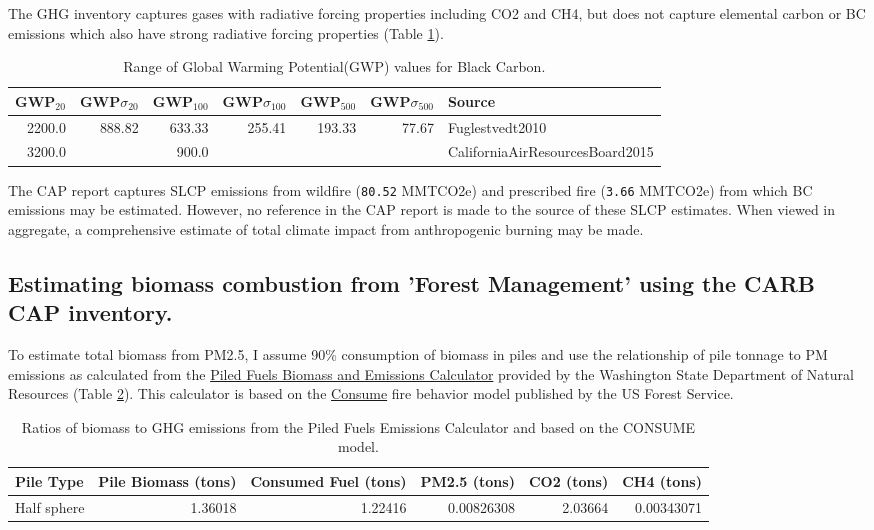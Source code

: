 \documentclass[a4paper,titlepage]{article}
\begin{document}
The \ac{GHG} inventory captures
gases with radiative forcing properties including CO2 and CH4, but does not capture elemental
carbon or \ac{BC} emissions which also have strong radiative
forcing properties (Table \ref{tab:bc_gwp}). 

\begin{table}[htb]
\centering
\begin{tabular}{rrrrrrl}
GWP\(_{\text{20}}\) & GWP\(\sigma_{\text{20}}\) & GWP\(_{\text{100}}\) & GWP\(\sigma_{\text{100}}\) & GWP\(_{\text{500}}\) & GWP\(\sigma_{\text{500}}\) & Source\\
\hline
2200.0 & 888.82 & 633.33 & 255.41 & 193.33 & 77.67 & Fuglestvedt2010\\
3200.0 &  & 900.0 &  &  &  & CaliforniaAirResourcesBoard2015\\
\end{tabular}
\caption{Range of Global Warming Potential(GWP) values for Black Carbon.\label{tab:bc_gwp}}

\end{table}


The \citet{CaliforniaAirResourcesBoard2015,CaliforniaAirResourcesBoard2016}
\ac{CAP} report captures \ac{SLCP} emissions from wildfire
(\texttt{80.52} MMTCO2e) and prescribed fire
(\texttt{3.66} MMTCO2e) from which \ac{BC} emissions may be estimated. However, no reference in the \ac{CAP} report is made to the source of these
SLCP estimates. When viewed in aggregate, a comprehensive estimate of total climate impact from anthropogenic burning may be made. 

\subsection{Estimating biomass combustion from 'Forest Management' using the \acl{CARB} \acl{CAP} inventory.}
\label{sec:orgheadline5}

To estimate total biomass from \ac{PM2.5}, I assume 90\% consumption of biomass in piles and use the relationship of pile tonnage to PM emissions as calculated from the \href{http://depts.washington.edu/nwfire/piles/}{Piled Fuels Biomass and Emissions Calculator} provided by the Washington State Department of Natural Resources (Table \ref{tab:pfbec}). This calculator is based on the \href{http://www.fs.fed.us/pnw/fera/research/smoke/consume/index.shtml}{Consume} fire behavior model published by the US Forest Service. 

\begin{table}[htb]
\centering
\begin{tabular}{lrrrrr}
Pile Type & Pile Biomass (tons) & Consumed Fuel (tons) & PM2.5 (tons) & CO2 (tons) & CH4 (tons)\\
\hline
Half sphere & 1.36018 & 1.22416 & 0.00826308 & 2.03664 & 0.00343071\\
\end{tabular}
\caption{\label{tab:orgtable1}
Ratios of biomass to \ac{GHG} emissions from the Piled Fuels Emissions Calculator and based on the CONSUME model.\label{tab:pfbec}}

\end{table}
\end{document}
